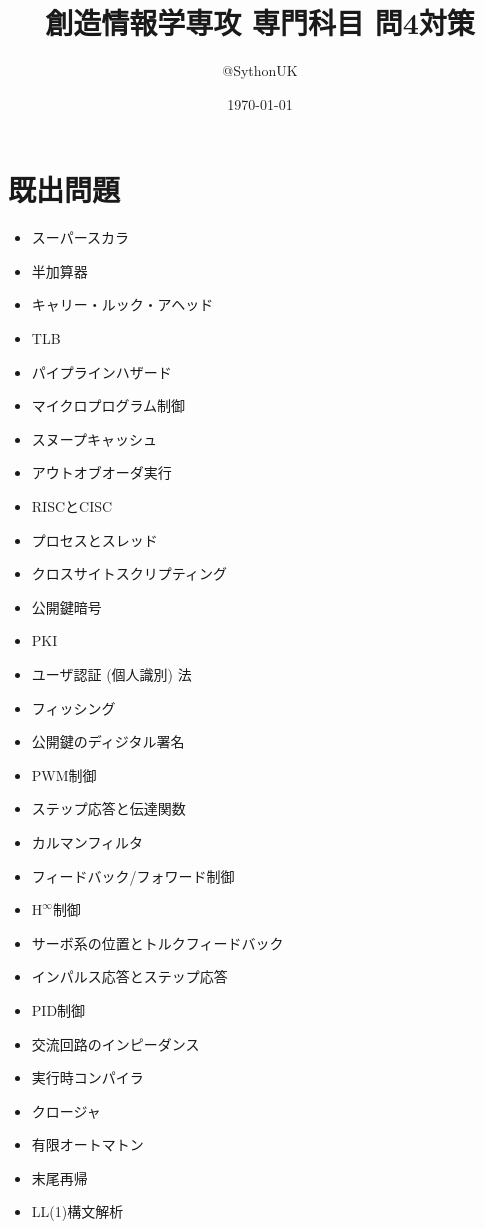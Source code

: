 \documentclass[a4j, titlepage, 11pt]{jsarticle}
\begin{document}
\title{創造情報学専攻 専門科目 問4対策}
\author{@SythonUK}
\date{\today}

\maketitle

\tableofcontents
\clearpage

\section{既出問題}
\begin{multicols}{2}
\begin{itemize}
	\item スーパースカラ
	\item 半加算器
	\item キャリー・ルック・アヘッド
	\item TLB
	\item パイプラインハザード
	\item マイクロプログラム制御
	\item スヌープキャッシュ
	\item アウトオブオーダ実行
	\item RISCとCISC
	\item プロセスとスレッド
	\item クロスサイトスクリプティング
	\item 公開鍵暗号
	\item PKI
	\item ユーザ認証 (個人識別) 法
	\item フィッシング
	\item 公開鍵のディジタル署名
	\item PWM制御
	\item ステップ応答と伝達関数
	\item カルマンフィルタ
	\item フィードバック/フォワード制御
	\item $\mathrm{H}^{\infty}$制御
	\item サーボ系の位置とトルクフィードバック
	\item インパルス応答とステップ応答
	\item PID制御
	\item 交流回路のインピーダンス
	\item 実行時コンパイラ
	\item クロージャ
	\item 有限オートマトン
	\item 末尾再帰
	\item LL(1)構文解析

\end{itemize}
\end{multicols}
\end{document}
